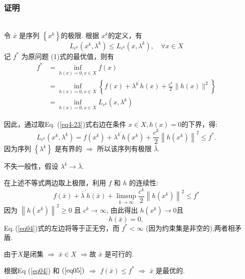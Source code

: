 \documentclass[handout,10pt]{beamer} %
\begin{document}
\begin{frame}
\frametitle{证明}
\\
令 $\bar{x}$ 是序列 $\left\{x^{k}\right\}$的极限. 根据 $x^{k}$的定义，有
\begin{equation}\label{eq4-23}
L_{c^{k}}\left(x^{k}, \lambda^{k}\right) \leq L_{c^{k}}\left(x, \lambda^{k}\right), \quad \forall x \in X
\end{equation}
记 $f^{*}$ 为原问题 (1)式的最优值，则有
$$
\begin{aligned}
f^{*} &=\inf _{h(x)=0, x \in X} f(x) \\
&=\inf _{h(x)=0, x \in X}\left\{f(x)+\lambda^{k^{\prime}} h(x)+\frac{\mathrm{c}^{k}}{2}\|h(x)\|^{2}\right\} \\
&=\inf _{h(x)=0, x \in X} L_{c^{k}}\left(x, \lambda^{k}\right)
\end{aligned}
$$
\end{frame}

\begin{frame}

因此，通过取Eq. (\ref{eq4-23})式右边在条件  $x \in X, h(x)=0$的下界，得:
$$
L_{c^{k}}\left(x^{k}, \lambda^{k}\right)=f\left(x^{k}\right)+\lambda^{k^{\prime}} h\left(x^{k}\right)+\frac{c^{k}}{2}\left\|h\left(x^{k}\right)\right\|^{2} \leq f^{*} .
$$
因为序列 $\left\{\lambda^{k}\right\}$ 是有界的 $\Rightarrow$
  所以该序列有极限 $\bar{\lambda}$.

  不失一般性，假设 $\lambda^{k} \rightarrow \bar{\lambda}$.
\end{frame}


\begin{frame}																				
												
在上述不等式两边取上极限，利用 $f$ 和 $h$ 的连续性:
\begin{equation}\label{eq04}
f(\bar{x})+\bar{\lambda}^{\prime} h(\bar{x})+\limsup _{k \rightarrow \infty} \frac{c^{k}}{2}\left\|h\left(x^{k}\right)\right\|^{2} \leq f^{*}
\end{equation}
因为 $\left\|h\left(x^{k}\right)\right\|^{2} \geq 0$ 且 $c^{k} \rightarrow \infty$, 由此得出 $h\left(x^{k}\right) \rightarrow 0$且
\begin{equation}\label{eq05}
h(\bar{x})=0,
\end{equation}
 Eq.\,(\ref{eq04})式的左边将等于正无穷，而  $f^{*}<\infty$ (因为约束集是非空的),两者相矛盾.

  由于$X$是闭集  $\Rightarrow$ $\bar{x} \in X  $
  $\Rightarrow$故 $\bar{x}$ 是可行的.

  根据Eq  (\ref{eq04}) 和 $(\ref{eq05})$ $\Rightarrow$ $f(\bar{x}) \leq f^{*}$ $\Rightarrow$ $\bar{x}$ 是最优的.   
\end{frame}
\end{document}
